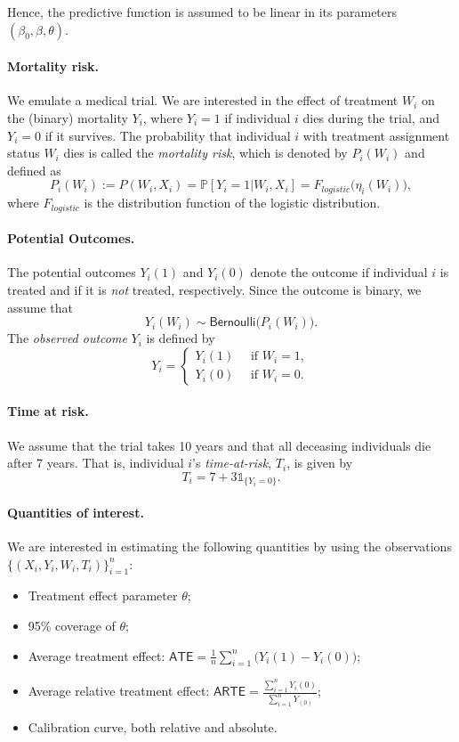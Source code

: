 \documentclass[11pt]{article}
\renewcommand{\P}{\mathbb{P}}
\newcommand{\indic}{\mathds{1}}
\begin{document}
Hence, the predictive function is assumed to be linear in its parameters $(\beta_0, \beta, \theta)$.

\paragraph{Mortality risk.} We emulate a medical trial. We are interested in the effect of treatment $W_i$ on the (binary) mortality $Y_i$, where $Y_i=1$ if individual $i$ dies during the trial, and $Y_i=0$ if it survives. The probability that individual $i$ with treatment assignment status $W_i$ dies is called the \textit{mortality risk}, which is denoted by $P_i(W_i)$ and defined as
\[
P_i(W_i) := P(W_i, X_i) = \P [Y_i=1 | W_i, X_i]
= F_{logistic}\Big( \eta_i(W_i) \Big),
\]
where $F_{logistic}$ is the distribution function of the logistic distribution.

\paragraph{Potential Outcomes.} 
The potential outcomes $Y_i(1)$ and $Y_i(0)$ denote the outcome if individual $i$ is treated and if it is \textit{not} treated, respectively. Since the outcome is binary, we assume that
\[
    Y_i(W_i) \sim \textsf{Bernoulli} \Big( P_i(W_i) \Big). 
\]
The \textit{observed outcome} $Y_i$ is defined by
\[
    Y_i = 
    \begin{cases}
    Y_i(1) \quad \text{ if } W_i =1, \\
    Y_i(0) \quad \text{ if } W_i =0.
    \end{cases}
\]

\paragraph{Time at risk.} We assume that the trial takes 10 years and that all deceasing individuals die after 7 years. That is, individual $i$'s \textit{time-at-risk}, $T_i$, is given by
\[
    T_i = 7 + 3\indic_{\{ Y_i = 0\}}.
\]

\paragraph{Quantities of interest.}
We are interested in estimating the following quantities by using the observations $\{(X_i, Y_i, W_i, T_i)\}_{i=1}^n$:
\begin{itemize}
    \item Treatment effect parameter $\theta$;
    \item 95\% coverage of $\theta$;
    \item Average treatment effect: $\textsf{ATE} = \frac{1}{n} \sum_{i=1}^n \big(Y_i(1) - Y_i(0)\big)$;
    \item Average relative treatment effect: $\textsf{ARTE} = \frac{\sum_{i=1}^n Y_i(0)}{\sum_{i=1}^n Y_(0)}$;
    \item Calibration curve, both relative and absolute.
\end{itemize}
\end{document}

